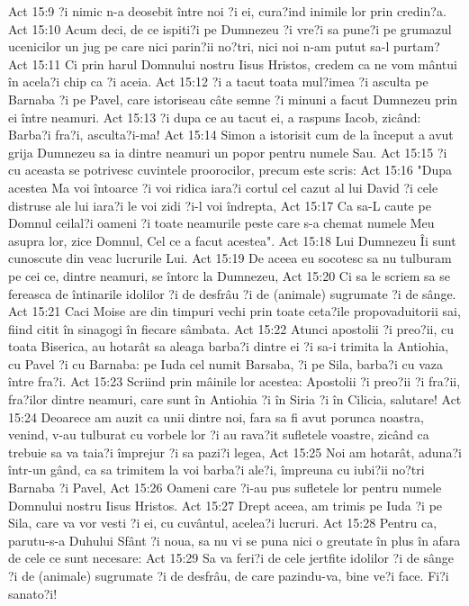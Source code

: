 Act 15:9  ?i nimic n-a deosebit între noi ?i ei, cura?ind inimile lor prin credin?a.
Act 15:10  Acum deci, de ce ispiti?i pe Dumnezeu ?i vre?i sa pune?i pe grumazul ucenicilor un jug pe care nici parin?ii no?tri, nici noi n-am putut sa-l purtam?
Act 15:11  Ci prin harul Domnului nostru Iisus Hristos, credem ca ne vom mântui în acela?i chip ca ?i aceia.
Act 15:12  ?i a tacut toata mul?imea ?i asculta pe Barnaba ?i pe Pavel, care istoriseau câte semne ?i minuni a facut Dumnezeu prin ei între neamuri.
Act 15:13  ?i dupa ce au tacut ei, a raspuns Iacob, zicând: Barba?i fra?i, asculta?i-ma!
Act 15:14  Simon a istorisit cum de la început a avut grija Dumnezeu sa ia dintre neamuri un popor pentru numele Sau.
Act 15:15  ?i cu aceasta se potrivesc cuvintele proorocilor, precum este scris:
Act 15:16  "Dupa acestea Ma voi întoarce ?i voi ridica iara?i cortul cel cazut al lui David ?i cele distruse ale lui iara?i le voi zidi ?i-l voi îndrepta,
Act 15:17  Ca sa-L caute pe Domnul ceilal?i oameni ?i toate neamurile peste care s-a chemat numele Meu asupra lor, zice Domnul, Cel ce a facut acestea".
Act 15:18  Lui Dumnezeu Îi sunt cunoscute din veac lucrurile Lui.
Act 15:19  De aceea eu socotesc sa nu tulburam pe cei ce, dintre neamuri, se întorc la Dumnezeu,
Act 15:20  Ci sa le scriem sa se fereasca de întinarile idolilor ?i de desfrâu ?i de (animale) sugrumate ?i de sânge.
Act 15:21  Caci Moise are din timpuri vechi prin toate ceta?ile propovaduitorii sai, fiind citit în sinagogi în fiecare sâmbata.
Act 15:22  Atunci apostolii ?i preo?ii, cu toata Biserica, au hotarât sa aleaga barba?i dintre ei ?i sa-i trimita la Antiohia, cu Pavel ?i cu Barnaba: pe Iuda cel numit Barsaba, ?i pe Sila, barba?i cu vaza între fra?i.
Act 15:23  Scriind prin mâinile lor acestea: Apostolii ?i preo?ii ?i fra?ii, fra?ilor dintre neamuri, care sunt în Antiohia ?i în Siria ?i în Cilicia, salutare!
Act 15:24  Deoarece am auzit ca unii dintre noi, fara sa fi avut porunca noastra, venind, v-au tulburat cu vorbele lor ?i au rava?it sufletele voastre, zicând ca trebuie sa va taia?i împrejur ?i sa pazi?i legea,
Act 15:25  Noi am hotarât, aduna?i într-un gând, ca sa trimitem la voi barba?i ale?i, împreuna cu iubi?ii no?tri Barnaba ?i Pavel,
Act 15:26  Oameni care ?i-au pus sufletele lor pentru numele Domnului nostru Iisus Hristos.
Act 15:27  Drept aceea, am trimis pe Iuda ?i pe Sila, care va vor vesti ?i ei, cu cuvântul, acelea?i lucruri.
Act 15:28  Pentru ca, parutu-s-a Duhului Sfânt ?i noua, sa nu vi se puna nici o greutate în plus în afara de cele ce sunt necesare:
Act 15:29  Sa va feri?i de cele jertfite idolilor ?i de sânge ?i de (animale) sugrumate ?i de desfrâu, de care pazindu-va, bine ve?i face. Fi?i sanato?i!
